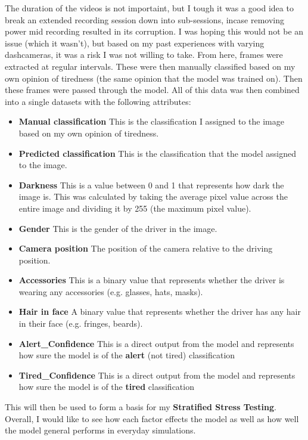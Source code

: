 The duration of the videos is not importaint, but I tough it was a good idea to break an extended recording session down into sub-sessions,
incase removing power mid recording resulted in its corruption. I was hoping this would not be an issue (which it wasn't), but based on my
past experiences with varying dashcameras, it was a risk I was not willing to take. From here, frames were extracted at regular intervals.
These were then manually classified based on my own opinion of tiredness (the same opinion that the model was trained on). Then these
frames were passed through the model. All of this data was then combined into a single datasets with the following attributes:
\begin{itemize}
    \item \textbf{Manual classification} This is the classification I assigned to the image based on my own opinion of tiredness.
    \item \textbf{Predicted classification} This is the classification that the model assigned to the image.
    \item \textbf{Darkness} This is a value between 0 and 1 that represents how dark the image is. This was calculated by taking the average
    pixel value across the entire image and dividing it by 255 (the maximum pixel value).
    \item \textbf{Gender} This is the gender of the driver in the image.
    \item \textbf{Camera position} The position of the camera relative to the driving position.
    \item \textbf{Accessories} This is a binary value that represents whether the driver is wearing any accessories (e.g. glasses, hats,
    masks).
    \item \textbf{Hair in face} A binary value that represents whether the driver has any hair in their face (e.g. fringes, beards).
    \item \textbf{Alert\_Confidence} This is a direct output from the model and represents how sure the model is of the
    \textbf{alert} (not tired) classification
    \item \textbf{Tired\_Confidence} This is a direct output from the model and represents how sure the model is of the
    \textbf{tired} classification
\end{itemize}
This will then be used to form a basis for my \textbf{Stratified Stress Testing}.
Overall, I would like to see how each factor effects the model as well as how well the model general performs in everyday simulations.


